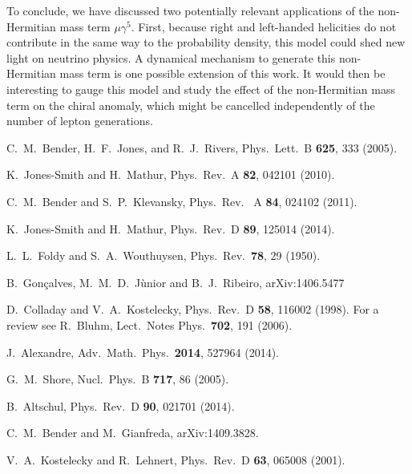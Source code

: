\documentclass[11pt,prd,aps,amssymb,amsmath,tightenlines,showpacs]{revtex4}
\begin{document}
To conclude, we have discussed two potentially relevant applications of the
non-Hermitian mass term $\mu\gamma^5$. First, because right and left-handed
helicities do not contribute in the same way to the probability density, this
model could shed new light on neutrino physics. A dynamical mechanism to
generate this non-Hermitian mass term is one possible extension of this work.
It would then be interesting to gauge this model and study the effect of the
non-Hermitian mass term on the chiral anomaly, which might be cancelled
independently of the number of lepton generations.

\begin{thebibliography}{99}

 C.~M.~Bender, H.~F.~Jones, and R.~J.~Rivers, Phys.~Lett.~B {\bf
625}, 333 (2005). %
 
 K.~Jones-Smith and H.~Mathur, Phys.~Rev.~A {\bf 82}, 042101
(2010).

 C.~M.~Bender and S.~P.~Klevansky, Phys.~Rev.~ A {\bf 84}, 024102
(2011). %

 K.~Jones-Smith and H.~Mathur, Phys.~Rev.~D {\bf 89}, 125014 (2014).

 L.~L.~Foldy and S.~A.~Wouthuysen, Phys.~Rev.~{\bf 78}, 29 (1950).

 B.~Gon\c{c}alves, M.~M.~D.~J\`unior and B.~J.~Ribeiro, arXiv:1406.5477
 
 D.~Colladay and V.~A.~Kostelecky, Phys.~Rev.~D {\bf 58}, 116002
(1998). %
For a review see R.~Bluhm, Lect.~Notes Phys.~{\bf 702}, 191 (2006).
 
 J.~Alexandre, Adv.~Math.~Phys.~{\bf 2014}, 527964 (2014).

 G.~M.~Shore, Nucl.~Phys.~B {\bf 717}, 86 (2005). %

 B.~Altschul, Phys.~Rev.~D {\bf 90}, 021701 (2014).

 C.~M.~Bender and M.~Gianfreda, arXiv:1409.3828.

 V.~A.~Kostelecky and R.~Lehnert, Phys.~Rev.~D {\bf 63}, 065008
(2001). %

\end{thebibliography}
\end{document}
